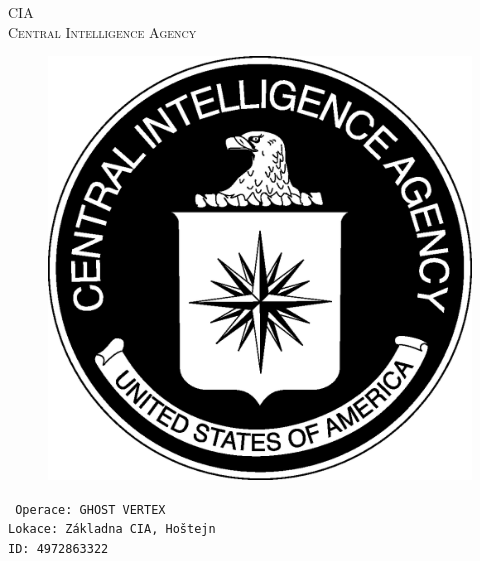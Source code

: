 \documentclass[a4paper, \fontheight]{article}
\begin{document}
	\begin{titlepage}
		\begin{center}		
			\textsc{{\fontsize{80}{0}\selectfont CIA}\\[2em]
				\Huge Central Intelligence Agency\\[2.5em]}
				
			\begin{figure}[H]
				\centering
				\includegraphics[scale=0.6]{sources/CIA_logo.eps}
			\end{figure}
		\end{center}	
		\vfill
		\noindent
		\texttt{\LARGE
				Operace: GHOST VERTEX\\[0.4em]
				Lokace: Základna CIA, Hoštejn\\[0.4em]
				ID: 4972863322}	
\end{titlepage} 
\end{document}
